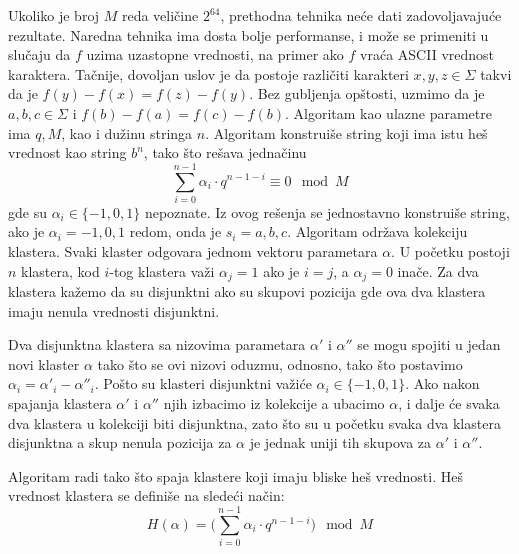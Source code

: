 \noindent
\begin{minipage}[l]{\textwidth}

\end{minipage}

Ukoliko je broj $M$ reda veli\v cine $2^{64}$, prethodna tehnika ne\' ce dati zadovoljavaju\' ce rezultate. Naredna tehnika ima dosta bolje performanse, i mo\v ze se primeniti u slu\v caju da $f$ uzima uzastopne vrednosti, na primer ako $f$ vra\' ca ASCII vrednost karaktera. Ta\v cnije, dovoljan uslov je da postoje razli\v citi karakteri $x,y,z \in \Sigma$ takvi da je $f(y)-f(x) = f(z)-f(y)$. Bez gubljenja op\v stosti, uzmimo da je $a,b,c \in \Sigma$ i $f(b) - f(a) = f(c) - f(b)$. Algoritam kao ulazne parametre ima $q,M$, kao i du\v zinu stringa $n$. Algoritam konstrui\v se string koji ima istu he\v s vrednost kao string $b^n$, tako \v sto re\v sava jedna\v cinu
\begin{equation}
    \sum_{i=0}^{n-1} \alpha_i \cdot q^{n-1-i} \equiv 0 \mod M
\end{equation}
gde su $\alpha_i \in \{-1, 0, 1\}$ nepoznate. Iz ovog re\v senja se jednostavno konstrui\v se string, ako je $\alpha_i = -1,0,1$ redom, onda je $s_i = a,b,c$. Algoritam odr\v zava kolekciju klastera. Svaki klaster odgovara jednom vektoru parametara $\alpha$. U po\v cetku postoji $n$ klastera, kod $i$-tog klastera va\v zi $\alpha_j = 1$ ako je $i=j$, a $\alpha_j = 0$ ina\v ce. Za dva klastera ka\v zemo da su disjunktni ako su skupovi pozicija gde ova dva klastera imaju nenula vrednosti disjunktni.

Dva disjunktna klastera sa nizovima parametara $\alpha'$ i $\alpha''$ se mogu spojiti u jedan novi klaster $\alpha$ tako \v sto se ovi nizovi oduzmu, odnosno, tako \v sto postavimo $\alpha_i = \alpha'_i - \alpha''_i$. Po\v sto su klasteri disjunktni va\v zi\' ce $\alpha_i \in \{-1, 0, 1\}$. Ako nakon spajanja klastera $\alpha'$ i $\alpha''$ njih izbacimo iz kolekcije a ubacimo $\alpha$, i dalje \' ce svaka dva klastera u kolekciji biti disjunktna, zato \v sto su u po\v cetku svaka dva klastera disjunktna a skup nenula pozicija za $\alpha$ je jednak uniji tih skupova za $\alpha'$ i $\alpha''$.

Algoritam radi tako \v sto spaja klastere koji imaju bliske he\v s vrednosti. He\v s vrednost klastera se defini\v se na slede\' ci na\v cin:
\begin{equation}
    H(\alpha) = \Big(\sum_{i=0}^{n-1} \alpha_i \cdot q^{n-1-i}\Big) \mod M
\end{equation}

